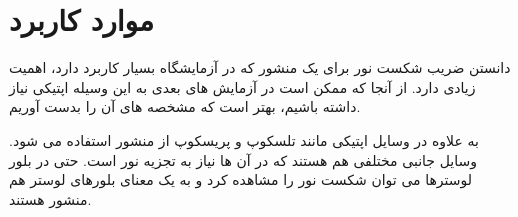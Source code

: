 \documentclass{article}
\begin{document}
\section{موارد کاربرد}
دانستن ضریب شکست نور برای یک منشور که در آزمایشگاه بسیار کاربرد دارد، اهمیت زیادی دارد. از آنجا که ممکن است در آزمایش های بعدی به این وسیله اپتیکی نیاز داشته باشیم، بهتر است که مشخصه های آن را بدست آوریم.

به علاوه در وسایل اپتیکی مانند تلسکوپ و پریسکوپ از منشور استفاده می شود. وسایل جانبی مختلفی هم هستند که در آن ها نیاز به تجزیه نور است. حتی در بلور لوسترها می توان شکست نور را مشاهده کرد و به یک معنای بلورهای لوستر هم منشور هستند.
\end{document}
